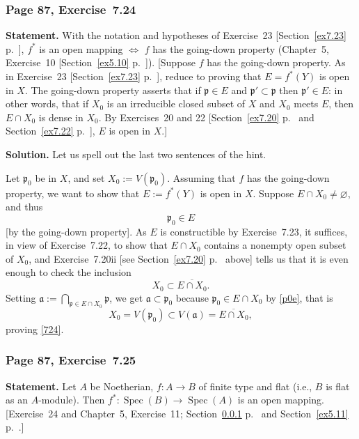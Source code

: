 \documentclass[12pt,letterpaper]{article}%
\newcommand{\mf}{\mathfrak}
\newcommand{\aaa}{\mf a}
\newcommand{\ppp}{\mf p}
\newcommand{\Spec}{\operatorname{Spec}}\newcommand{\Sp}{\operatorname{Spec}}
\newcommand{\nn}{\noindent}
\begin{document}
\subsubsection{Page 87, Exercise~7.24}\label{ex7.24}%

\textbf{Statement.} With the notation and hypotheses of Exercise~23 [Section~\ref{ex7.23} p.~\pageref{ex7.23}], $f^*$ is an open mapping $\iff$ $f$ has the going-down property (Chapter~5, Exercise~10 [Section~\ref{ex5.10} p.~\pageref{ex5.10}]). [Suppose $f$ has the going-down property. As in Exercise~23 [Section~\ref{ex7.23} p.~\pageref{ex7.23}], reduce to proving that $E=f^*(Y)$ is open in $X$. The going-down property asserts that if $\ppp\in E$ and $\ppp'\subset\ppp$ then $\ppp'\in E$: in other words, that if $X_0$ is an irreducible closed subset of $X$ and $X_0$ meets $E$, then $E\cap X_0$ is dense in $X_0$. By Exercises~20 and 22 [Section~\ref{ex7.20} p.~\pageref{ex7.20} and Section~\ref{ex7.22} p.~\pageref{ex7.22}], $E$ is open in $X$.]

\nn\textbf{Solution.} Let us spell out the last two sentences of the hint.

Let $\ppp_0$ be in $X$, and set $X_0:=V(\ppp_0)$. Assuming that $f$ has the going-down property, we want to show that $E:=f^*(Y)$ is open in $X$. Suppose $E\cap X_0\ne\varnothing$, and thus 
\begin{equation}\label{p0e}
\ppp_0\in E
\end{equation} 
[by the going-down property]. As $E$ is constructible by Exercise~7.23, it suffices, in view of Exercise~7.22, to show that $E\cap X_0$ contains a nonempty open subset of $X_0$, and Exercise~7.20ii [see Section~\ref{ex7.20} p.~\pageref{ex7.20} above] tells us that it is even enough to check the inclusion 
\begin{equation}\label{724}
X_0\subset\overline{E\cap X_0}.
\end{equation} 
Setting $\aaa:=\bigcap_{\ppp\in E\cap X_0}\ppp$, we get $\aaa\subset\ppp_0$ because $\ppp_0\in E\cap X_0$ by \eqref{p0e}, that is 
$$
X_0=V(\ppp_0)\subset V(\aaa)=\overline{E\cap X_0},
$$ 
proving \eqref{724}.

\subsubsection{Page 87, Exercise~7.25}%

\textbf{Statement.} Let $A$ be Noetherian, $f:A \to B$ of finite type and flat (i.e., $B$ is flat as an $A$-module). Then $f^*:\Spec(B)\to\Spec(A)$ is an open mapping. [Exercise~24 and Chapter~5, Exercise~11; Section~\ref{ex7.24} p.~\pageref{ex7.24} and Section~\ref{ex5.11} p.~\pageref{ex5.11}.]
\end{document}
